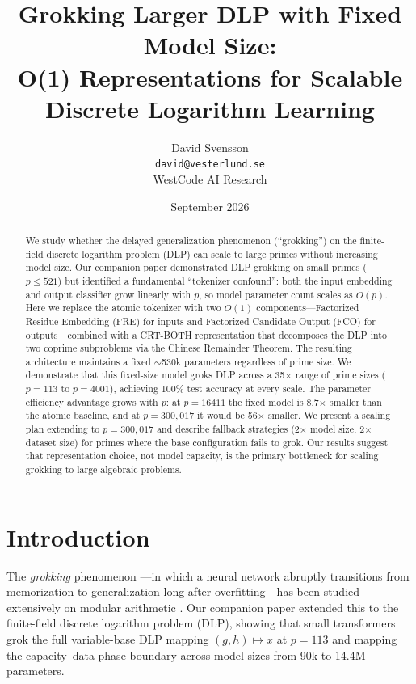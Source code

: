 \documentclass[11pt]{article}
\title{Grokking Larger DLP with Fixed Model Size: \\
O(1) Representations for Scalable Discrete Logarithm Learning}
\author{
David Svensson \\
\texttt{david@vesterlund.se} \\
WestCode AI Research
}
\date{September 2026}
\begin{document}
\maketitle

\begin{abstract}
We study whether the delayed generalization phenomenon (``grokking'') on the finite-field discrete logarithm problem (DLP) can scale to large primes without increasing model size. Our companion paper \citep{svensson2026scaling} demonstrated DLP grokking on small primes ($p \leq 521$) but identified a fundamental ``tokenizer confound'': both the input embedding and output classifier grow linearly with $p$, so model parameter count scales as $O(p)$. Here we replace the atomic tokenizer with two $O(1)$ components---Factorized Residue Embedding (FRE) for inputs and Factorized Candidate Output (FCO) for outputs---combined with a CRT-BOTH representation that decomposes the DLP into two coprime subproblems via the Chinese Remainder Theorem. The resulting architecture maintains a fixed $\sim$530k parameters regardless of prime size. We demonstrate that this fixed-size model groks DLP across a 35$\times$ range of prime sizes ($p = 113$ to $p = 4001$), achieving 100\% test accuracy at every scale. The parameter efficiency advantage grows with $p$: at $p = 16411$ the fixed model is 8.7$\times$ smaller than the atomic baseline, and at $p = 300{,}017$ it would be 56$\times$ smaller. We present a scaling plan extending to $p = 300{,}017$ and describe fallback strategies (2$\times$ model size, 2$\times$ dataset size) for primes where the base configuration fails to grok. Our results suggest that representation choice, not model capacity, is the primary bottleneck for scaling grokking to large algebraic problems.
\end{abstract}



\section{Introduction}
\label{sec:intro}

The \emph{grokking} phenomenon \citep{power2022grokking}---in which a neural network abruptly transitions from memorization to generalization long after overfitting---has been studied extensively on modular arithmetic \citep{nanda2023progress, liu2022understanding, varma2023explaining, thilak2022slingshot}. Our companion paper \citep{svensson2026scaling} extended this to the finite-field discrete logarithm problem (DLP), showing that small transformers grok the full variable-base DLP mapping $(g, h) \mapsto x$ at $p = 113$ and mapping the capacity--data phase boundary across model sizes from 90k to 14.4M parameters.
\end{document}
